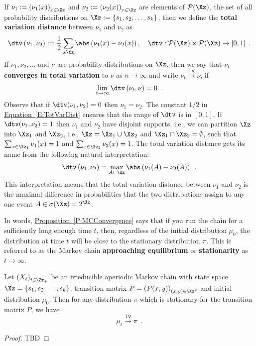 \begin{definition}\label{D:TotVarDist}
If $\nu_1:=\left(\nu_1(x)\right)_{x\in \Xz}$ and $\nu_2 := \left(\nu_2(x)\right)_{x\in \Xz}$ are elements of $\mathcal{P}(\Xz)$, the set of all probability distributions on $\Xz:=\{s_1,s_2,\ldots,s_k\}$, then we define the {\bf total variation distance} between $\nu_1$ and $\nu_2$ as
\begin{equation}\label{E:TotVarDist}
\dtv \left( \nu_1, \nu_2 \right) := \frac{1}{2} \sum_{x \Xz} \abs \left( \nu_1(x) - \nu_2(x) \right), \quad \dtv : \mathcal{P}(\Xz) \times \mathcal{P}(\Xz)  \to [0,1] \enspace .
\end{equation}
If $\nu_1, \nu_2, \ldots$ and $\nu$ are probability distributions on $\Xz$, then we say that $\nu_t$ {\bf converges in total variation} to $\nu$ as $n \to \infty$ and write $\nu_t  \overset{\mathsf{TV}}{\longrightarrow} \nu$, if
\[
\lim_{t \to \infty} \dtv \left( \nu_t, \nu \right) = 0 \enspace .
\]
Observe that if $\dtv(\nu_1,\nu_2)=0$ then $\nu_1=\nu_2$. The constant $1/2$ in \hyperref[E:TotVarDist]{Equation~\ref*{E:TotVarDist}} ensures that the range of $\dtv$ is in $[0,1]$.  If $\dtv(\nu_1,\nu_2)=1$ then $\nu_1$ and $\nu_2$ have disjoint  supports, i.e., we can partition $\Xz$ into $\Xz_1$ and $\Xz_2$, i.e., $\Xz=\Xz_1 \cup \Xz_2$ and $\Xz_1 \cap \Xz_2 = \emptyset$, such that $\sum_{x \in \Xz_1} \nu_1(x)=1$ and  $\sum_{x \in \Xz_2} \nu_2(x)=1$.  The total variation distance gets its name from the following natural interpretation:
\[
\dtv \left( \nu_1, \nu_2 \right) = \max_{A \subset \Xz} \abs \left( \nu_1(A) - \nu_2(A) \right) \enspace .
\]
This interpretation means that the total variation distance between $\nu_1$ and $\nu_2$ is the maximal difference in probabilities that the two distributions assign to any one event $A \in \sigma(\Xz) = 2^{\Xz}$. 
\end{definition}

In words, \hyperref[P:MCConvergence]{Proposition~\ref*{P:MCConvergence}} says that if you run the chain for a sufficiently long enough time $t$, then, regardless of the initial distribution $\mu_0$, the distribution at time $t$ will be close to the stationary distribution $\pi$.  This is referred to as the Markov chain {\bf approaching equilibrium} or {\bf stationarity} as $t \to \infty$.  

\begin{prop}\label{P:MCConvergence}
Let $\left( X_t \right)_{t \in \Zz_+}$ be an irreducible aperiodic Markov chain with state space $\Xz=\{s_1,s_2,\ldots,s_k\}$, transition matrix $P = \left( P(x,y) \right)_{(x,y) \in \Xz^2}$ and initial distribution $\mu_0$.  Then for any distribution $\pi$ which is stationary for the transition matrix $P$, we have
\begin{equation}
\mu_t \overset{\mathsf{TV}}{\longrightarrow} \pi  \enspace .
\end{equation}
\begin{proof}
TBD
\end{proof}
\end{prop}

